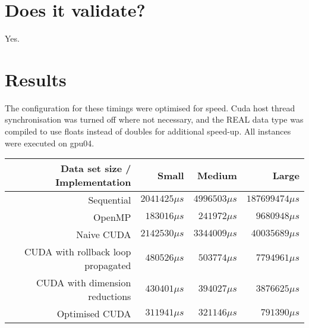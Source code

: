 \documentclass[]{report}
\begin{document}
\chapter{Does it validate?}
Yes.
\chapter{Results}
The configuration for these timings were optimised for speed. Cuda host thread synchronisation was turned off where not necessary, and the REAL data type was compiled to use floats instead of doubles for additional speed-up. All instances were executed on gpu04.
\begin{tabular}{|r|r|r|r|}
  \hline
  Data set size / Implementation & Small & Medium & Large\\
  \hline
  Sequential & $2041425 \mu s$ & $4996503 \mu s$ & $187699474 \mu s$ \\
 \hline
 OpenMP & $183016 \mu s$ & $241972 \mu s$ & $9680948 \mu s$\\
  \hline
 Naive CUDA & $2142530 \mu s$ & $3344009 \mu s$ & $40035689 \mu s$\\
  \hline
 CUDA with rollback loop propagated & $480526 \mu s$ & $503774 \mu s$ & $7794961 \mu s$\\
  \hline
 CUDA with dimension reductions & $430401 \mu s$ & $394027 \mu s$ & $3876625 \mu s$\\
  \hline
 Optimised CUDA & $311941 \mu s$ & $321146 \mu s$ & $791390 \mu s$\\
  \hline
\end{tabular}
\end{document}
